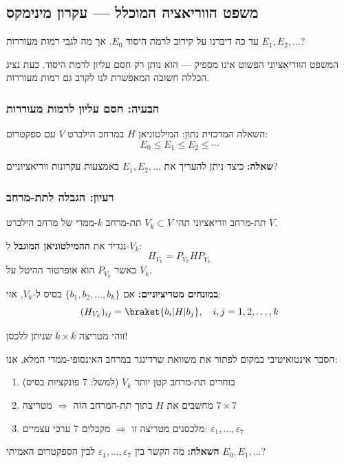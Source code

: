 \newpage

\subsection{משפט הווריאציה המוכלל — עקרון מינימקס}

עד כה דיברנו על קירוב לרמת היסוד $E_0$. אך מה לגבי רמות מעוררות $E_1, E_2, \ldots$? 

המשפט הווריאציוני הפשוט אינו מספיק — הוא נותן רק חסם עליון לרמת היסוד. כעת נציג הכללה חשובה המאפשרת לנו לקרב גם רמות מעוררות.

\subsubsection*{הבעיה: חסם עליון לרמות מעוררות}

\begin{importantbox}{השאלה המרכזית}
נתון: המילטוניאן $H$ במרחב הילברט $V$ עם ספקטרום:
\[
E_0 \leq E_1 \leq E_2 \leq \cdots
\]

\textbf{שאלה:} כיצד ניתן להעריך את $E_1, E_2, \ldots$ באמצעות עקרונות ווריאציוניים?
\end{importantbox}

\subsubsection*{רעיון: הגבלה לתת-מרחב}

\begin{definitionbox}{תת-מרחב ווריאציוני}
תהי $V_k \subset V$ תת-מרחב $k$-ממדי של מרחב הילברט $V$.

נגדיר את \textbf{ההמילטוניאן המוגבל} ל-$V_k$:
\[
H_{V_k} = P_{V_k} H P_{V_k}
\]
כאשר $P_{V_k}$ הוא אופרטור ההיטל על $V_k$.

\textbf{במונחים מטריציוניים:} אם $\{b_1, b_2, \ldots, b_k\}$ בסיס ל-$V_k$, אזי:
\[
(H_{V_k})_{ij} = \braket{b_i|H|b_j}, \quad i,j = 1, 2, \ldots, k
\]

זוהי מטריצה $k \times k$ שניתן ללכסן!
\end{definitionbox}

\begin{notebox}{הסבר אינטואיטיבי}
במקום לפתור את משוואת שרדינגר במרחב האינסופי-ממדי המלא, אנו:
\begin{enumerate}
    \item בוחרים תת-מרחב קטן יותר $V_k$ (למשל: 7 פונקציות בסיס)
    \item מחשבים את $H$ בתוך תת-המרחב הזה $\Rightarrow$ מטריצה $7 \times 7$
    \item מלכסנים מטריצה זו $\Rightarrow$ מקבלים 7 ערכי עצמיים: $\varepsilon_1, \ldots, \varepsilon_7$
\end{enumerate}

\textbf{השאלה:} מה הקשר בין $\varepsilon_1, \ldots, \varepsilon_7$ לבין הספקטרום האמיתי $E_0, E_1, \ldots$?
\end{notebox}

